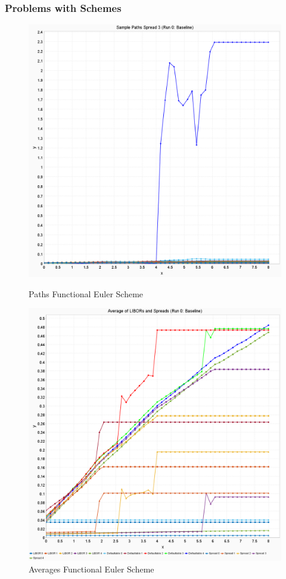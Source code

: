 \documentclass{beamer}
\begin{document}
	\begin{frame}
		\frametitle{Problems with Schemes}
		
		\begin{figure}
			\begin{minipage}[c]{0.4\linewidth}
				\centering
				\includegraphics[height=0.6\textheight]{VorstellungPics/ProblemsEULERFuncPaths}
				\caption{Paths Functional Euler Scheme}
				\label{fig:problemseulerfuncpaths}
			\end{minipage}
			\hfill
			\begin{minipage}[c]{0.4\linewidth}
				\centering
				\includegraphics[width=0.9\linewidth]{VorstellungPics/ProblemsEULERFuncAv}
				\caption{Averages Functional Euler Scheme}
				\label{fig:problemseulerfuncav}
			\end{minipage}%
		\end{figure}
		

\end{frame}
\end{document}
